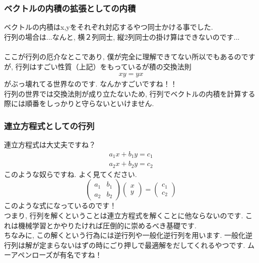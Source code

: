 \documentclass[11pt,a4paper]{jsarticle}
\begin{document}
\subsubsection{ベクトルの内積の拡張としての内積}
ベクトルの内積はx,yをそれぞれ対応するやつ同士かける事でした.\\
行列の場合は...なんと, 横２列同士, 縦2列同士の掛け算はできないのです...\\
\\
ここが行列の厄介なとこであり, 僕が完全に理解できてない所以でもあるのですが, 行列はすごい性質（上記）をもっているが積の交換法則
\begin{eqnarray}
xy = yx
\end{eqnarray}
がぶっ壊れてる世界なのです. なんかすごいですね！！\\
行列の世界では交換法則が成り立たないため, 行列でベクトルの内積を計算する際には順番をしっかりと守らないといけません.\\

\subsubsection{連立方程式としての行列}
連立方程式は大丈夫ですね？
\begin{eqnarray}
a_1x + b_1y = c_1
\end{eqnarray}
\begin{eqnarray}
a_2x + b_2y = c_2
\end{eqnarray}
このような奴らですね. よく見てください.
\[
  \left(	
  \begin{array}{cc}
  a_1 & b_1 \\
  a_2 & b_2
  \end{array}
  \right)
  \left(
  \begin{array}{c}
  x \\
  y
  \end{array}
  \right)
  =
  \left(
  \begin{array}{l}
  c_1\\
  c_2
  \end{array}
  \right)
\]
このような式になっているのです！\\
つまり, 行列を解くということは連立方程式を解くことに他ならないのです. これは機械学習とかやりたければ圧倒的に崇めるべき基礎です.\\
ちなみに, この解くという行為には逆行列や一般化逆行列を用います. 一般化逆行列は解が定まらないはずの時にごり押しで最適解をだしてくれるやつです. ムーアペンローズが有名ですね！\\
\end{document}
